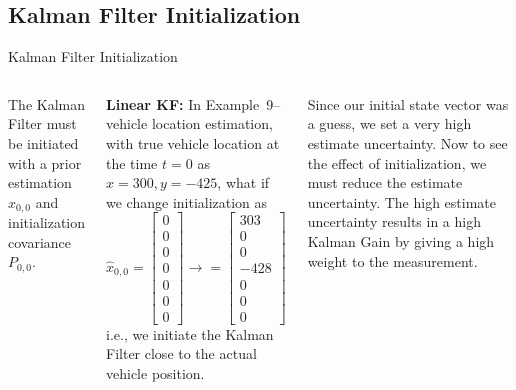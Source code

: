 \subsection{Kalman Filter Initialization}
\begin{frame}{Kalman Filter Initialization}

\begin{columns}
    The Kalman Filter must be initiated with a prior estimation $\hat{x}_{0,0}$ and initialization covariance ${P}_{0,0}$.
    \vspace{5pt}
    
    \textbf{Linear KF:} In Example~9--vehicle location estimation, with true vehicle location at the time $t = 0$ as $x = 300, y = -425$, what if we change initialization as
    \vspace{-5pt}
    \[
    \hat{x}_{0,0} =
    \begin{bmatrix}
    0 \\
    0 \\
    0 \\
    0 \\
    0 \\
    0 \\
    0
    \end{bmatrix} \rightarrow = \begin{bmatrix}
    303 \\
    0 \\
    0 \\
    -428 \\
    0 \\
    0 \\
    0
    \end{bmatrix}
    \]
    i.e., we initiate the Kalman Filter close to the actual vehicle position. 

    \vspace{5pt}
    Since our initial state vector was a guess, we set a very high estimate uncertainty. Now to see the effect of initialization, we must reduce the estimate uncertainty. The high estimate uncertainty results in a high Kalman Gain by giving a high weight to the measurement.
    

\end{columns}
\end{frame}
